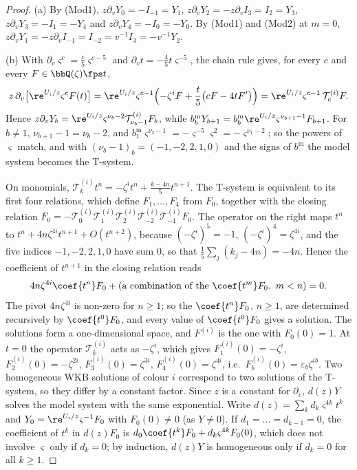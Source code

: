 \begin{proof}
(a) By (Mod1), $z\partial_vY_0=-I_{-1}=Y_1$, $z\partial_vY_2=-z\partial_vI_3=I_2=Y_3$, $z\partial_vY_3=-I_1=-Y_4$ and $z\partial_vY_4=-I_0=-Y_0$. By (Mod1) and (Mod2) at $m=0$, $z\partial_vY_1=-z\partial_vI_{-1}=I_{-2}=v^{-1}I_3=-v^{-1}Y_2$.

(b) With $\partial_v\varsigma^c=\frac c5\varsigma^{c-5}$ and $\partial_vt=-\frac45t\varsigma^{-5}$, the chain rule gives, for every $c$ and every $F\in\bbQ(\zeta)\fps t$,
\[
z\,\partial_v\bigl[\re^{U_i/z}\varsigma^cF(t)\bigr]=\re^{U_i/z}\varsigma^{c-1}\Bigl(-\zeta^iF+\frac t5\bigl(cF-4tF'\bigr)\Bigr)=\re^{U_i/z}\varsigma^{c-1}\,\mathcal T^{(i)}_cF .
\]
Hence $z\partial_vY_b=\re^{U_i/z}\varsigma^{\nu_b-2}\mathcal T^{(i)}_{\nu_b-1}F_b$, while $b^{\mathrm m}_bY_{b+1}=b^{\mathrm m}_b\re^{U_i/z}\varsigma^{\nu_{b+1}-1}F_{b+1}$. For $b\neq1$, $\nu_{b+1}-1=\nu_b-2$, and $b^{\mathrm m}_1\varsigma^{\nu_2-1}=-\varsigma^{-5}\varsigma^2=-\varsigma^{\nu_1-2}$; so the powers of $\varsigma$ match, and with $(\nu_b-1)_b=(-1,-2,2,1,0)$ and the signs of $b^{\mathrm m}$ the model system becomes the T-system.

On monomials, $\mathcal T^{(i)}_kt^n=-\zeta^it^n+\frac{k-4n}5t^{n+1}$. The T-system is equivalent to its first four relations, which define $F_1,\dots,F_4$ from $F_0$, together with the closing relation $F_0=-\mathcal T^{(i)}_0\mathcal T^{(i)}_1\mathcal T^{(i)}_2\mathcal T^{(i)}_{-2}\mathcal T^{(i)}_{-1}F_0$. The operator on the right maps $t^n$ to $t^n+4n\zeta^{4i}t^{n+1}+O(t^{n+2})$, because $(-\zeta^i)^5=-1$, $(-\zeta^i)^4=\zeta^{4i}$, and the five indices $-1,-2,2,1,0$ have sum $0$, so that $\frac15\sum_j(k_j-4n)=-4n$. Hence the coefficient of $t^{n+1}$ in the closing relation reads
\[
4n\zeta^{4i}\coef{t^n}F_0+(\text{a combination of the }\coef{t^m}F_0,\ m<n)=0 .
\]
The pivot $4n\zeta^{4i}$ is non-zero for $n\geq1$; so the $\coef{t^n}F_0$, $n\geq1$, are determined recursively by $\coef{t^0}F_0$, and every value of $\coef{t^0}F_0$ gives a solution. The solutions form a one-dimensional space, and $F^{(i)}$ is the one with $F_0(0)=1$. At $t=0$ the operator $\mathcal T^{(i)}_k$ acts as $-\zeta^i$, which gives $F^{(i)}_1(0)=-\zeta^i$, $F^{(i)}_2(0)=-\zeta^{2i}$, $F^{(i)}_3(0)=\zeta^{3i}$, $F^{(i)}_4(0)=\zeta^{4i}$, i.e.\ $F^{(i)}_b(0)=\varepsilon_b\zeta^{ib}$. Two homogeneous WKB solutions of colour $i$ correspond to two solutions of the T-system, so they differ by a constant factor. Since $z$ is a constant for $\partial_v$, $d(z)Y$ solves the model system with the same exponential. Write $d(z)=\sum_kd_k\varsigma^{4k}t^k$ and $Y_0=\re^{U_i/z}\varsigma^{-1}F_0$ with $F_0(0)\neq0$ (as $Y\neq0$). If $d_1=\dots=d_{k-1}=0$, the coefficient of $t^k$ in $d(z)F_0$ is $d_0\coef{t^k}F_0+d_k\varsigma^{4k}F_0(0)$, which does not involve $\varsigma$ only if $d_k=0$; by induction, $d(z)Y$ is homogeneous only if $d_k=0$ for all $k\geq1$.
\end{proof}

